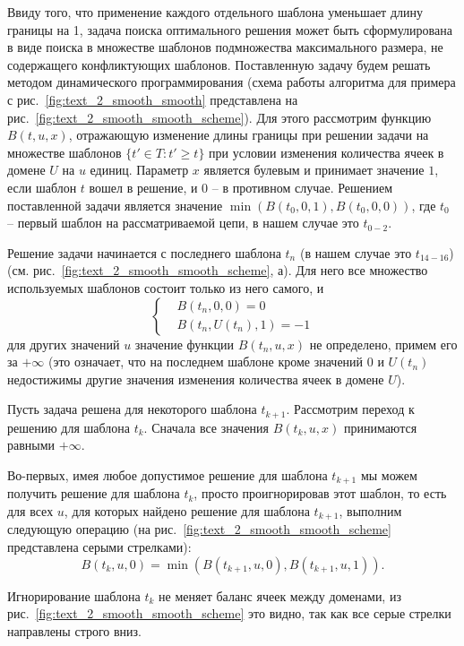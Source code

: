 Ввиду того, что применение каждого отдельного шаблона уменьшает длину границы на 1, задача поиска оптимального решения может быть сформулирована в виде поиска в множестве шаблонов подмножества максимального размера, не содержащего конфликтующих шаблонов.
Поставленную задачу будем решать методом динамического программирования (схема работы алгоритма для примера с рис.~\ref{fig:text_2_smooth_smooth} представлена на рис.~\ref{fig:text_2_smooth_smooth_scheme}).
Для этого рассмотрим функцию $B(t, u, x)$, отражающую изменение длины границы при решении задачи на множестве шаблонов $\{ t' \in T : t' \ge t \}$ при условии изменения количества ячеек в домене $U$ на $u$ единиц.
Параметр $x$ является булевым и принимает значение $1$, если шаблон $t$ вошел в решение, и $0$ -- в противном случае.
Решением поставленной задачи является значение $\min(B(t_0, 0, 1), B(t_0, 0, 0))$, где $t_0$ -- первый шаблон на рассматриваемой цепи, в нашем случае это $t_{0-2}$.

Решение задачи начинается с последнего шаблона $t_n$ (в нашем случае это $t_{14-16}$) (см. рис.~\ref{fig:text_2_smooth_smooth_scheme}, а).
Для него все множество используемых шаблонов состоит только из него самого, и
\begin{equation}
	\left\{
		\begin{aligned}
			& B(t_n, 0, 0) = 0 \\
			& B(t_n, U(t_n), 1) = -1
		\end{aligned}
	\right.
\end{equation}
для других значений $u$ значение функции $B(t_n, u, x)$ не определено, примем его за $+\infty$ (это означает, что на последнем шаблоне кроме значений $0$ и $U(t_n)$ недостижимы другие значения изменения количества ячеек в домене $U$).

Пусть задача решена для некоторого шаблона $t_{k + 1}$.
Рассмотрим переход к решению для шаблона $t_k$.
Сначала все значения $B(t_k, u, x)$ принимаются равными $+\infty$.

Во-первых, имея любое допустимое решение для шаблона $t_{k + 1}$ мы можем получить решение для шаблона $t_k$, просто проигнорировав этот шаблон, то есть для всех $u$, для которых найдено решение для шаблона $t_{k + 1}$, выполним следующую операцию (на рис.~\ref{fig:text_2_smooth_smooth_scheme} представлена серыми стрелками):
\begin{equation}
	B(t_k, u, 0) = \min \left( B(t_{k + 1}, u, 0), B(t_{k + 1}, u, 1) \right).
\end{equation}

Игнорирование шаблона $t_k$ не меняет баланс ячеек между доменами, из рис.~\ref{fig:text_2_smooth_smooth_scheme} это видно, так как все серые стрелки направлены строго вниз.

